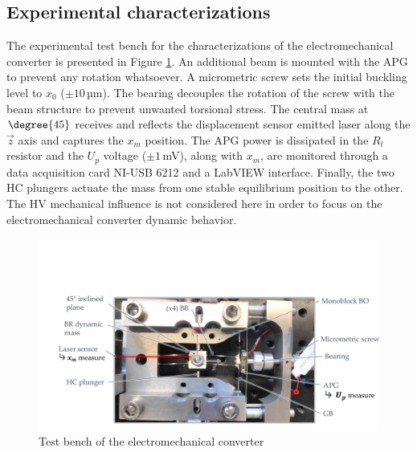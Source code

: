 \documentclass[3p,twocolumn,preprint]{elsarticle}
\begin{document}
	\subsection{Experimental characterizations}	
	\label{subsec:Experimental characterizations}
The experimental test bench for the characterizations of the electromechanical converter is presented in Figure \ref{fig:BDT_OB+GPA}. An additional beam is mounted with the APG to prevent any rotation whatsoever. A micrometric screw sets the initial buckling level to $x_0$ ($\pm 10$\,µm). The bearing decouples the rotation of the screw with the beam structure to prevent unwanted torsional stress. The central mass at $\degree{45}$ receives and reflects the displacement sensor emitted laser along the $\vec{z}$ axis and captures the $x_m$ position. The APG power is dissipated in the $R_l$ resistor and the $U_p$ voltage ($\pm 1$\,mV), along with $x_m$, are monitored through a data acquisition card NI-USB 6212 and a LabVIEW interface. Finally, the two HC plungers actuate the mass from one stable equilibrium position to the other. The HV mechanical influence is not considered here in order to focus on the electromechanical converter dynamic behavior. 
\begin{figure}[!htbp]
	\centering
	\captionsetup{justification=centering}
	\includegraphics[trim={2cm 0cm 0cm 5.5cm},clip,width=\linewidth]{figures/BDT_OB+GPA.pdf}
	\caption{Test bench of the electromechanical converter}
	\label{fig:BDT_OB+GPA}
\end{figure}
\end{document}
